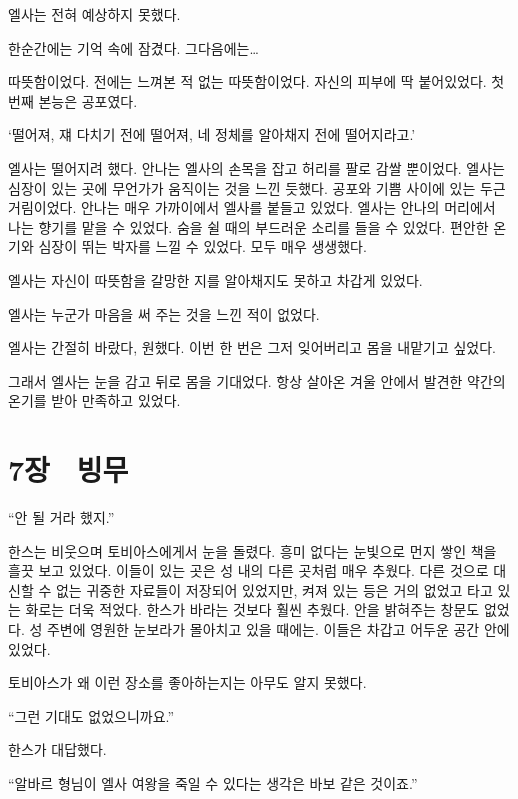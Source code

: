 \textbreak

엘사는 전혀 예상하지 못했다.

한순간에는 기억 속에 잠겼다. 그다음에는\ldots

따뜻함이었다. 전에는 느껴본 적 없는 따뜻함이었다. 자신의 피부에 딱 붙어있었다. 첫 번째 본능은 공포였다.

`떨어져, 쟤 다치기 전에 떨어져, 네 정체를 알아채지 전에 떨어지라고.'

엘사는 떨어지려 했다. 안나는 엘사의 손목을 잡고 허리를 팔로 감쌀 뿐이었다. 엘사는 심장이 있는 곳에 무언가가 움직이는 것을 느낀 듯했다. 공포와 기쁨 사이에 있는 두근거림이었다. 안나는 매우 가까이에서 엘사를 붙들고 있었다. 엘사는 안나의 머리에서 나는 향기를 맡을 수 있었다. 숨을 쉴 때의 부드러운 소리를 들을 수 있었다. 편안한 온기와 심장이 뛰는 박자를 느낄 수 있었다. 모두 매우 생생했다.

엘사는 자신이 따뜻함을 갈망한 지를 알아채지도 못하고 차갑게 있었다.

엘사는 누군가 마음을 써 주는 것을 느낀 적이 없었다.

엘사는 간절히 바랐다, 원했다. 이번 한 번은 그저 잊어버리고 몸을 내맡기고 싶었다.

그래서 엘사는 눈을 감고 뒤로 몸을 기대었다. 항상 살아온 겨울 안에서 발견한 약간의 온기를 받아 만족하고 있었다.



\chapter[7장  빙무][7장\hspace*{.5em}빙무]{7장 \ 빙무}



\forceindent``안 될 거라 했지.''

한스는 비웃으며 토비아스에게서 눈을 돌렸다. 흥미 없다는 눈빛으로 먼지 쌓인 책을 흘끗 보고 있었다. 이들이 있는 곳은 성 내의 다른 곳처럼 매우 추웠다. 다른 것으로 대신할 수 없는 귀중한 자료들이 저장되어 있었지만, 켜져 있는 등은 거의 없었고 타고 있는 화로는 더욱 적었다. 한스가 바라는 것보다 훨씬 추웠다. 안을 밝혀주는 창문도 없었다. 성 주변에 영원한 눈보라가 몰아치고 있을 때에는. 이들은 차갑고 어두운 공간 안에 있었다.

토비아스가 왜 이런 장소를 좋아하는지는 아무도 알지 못했다.

``그런 기대도 없었으니까요.''

한스가 대답했다.

``알바르 형님이 엘사 여왕을 죽일 수 있다는 생각은 바보 같은 것이죠.''

